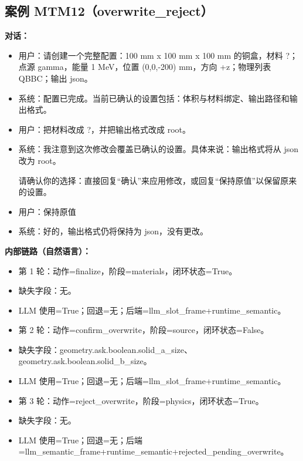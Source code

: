 \documentclass[11pt]{ctexart}
\begin{document}
\subsection{案例 MTM12（overwrite\_reject）}
\textbf{对话：}
\begin{itemize}
\item 用户：请创建一个完整配置：100 mm x 100 mm x 100 mm 的铜盒，材料 ?；点源 gamma，能量 1 MeV，位置 (0,0,-200) mm，方向 +z；物理列表 QBBC；输出 json。
\item 系统：配置已完成。当前已确认的设置包括：体积与材料绑定、输出路径和输出格式。
\item 用户：把材料改成 ?，并把输出格式改成 root。
\item 系统：我注意到这次修改会覆盖已确认的设置。具体来说：输出格式将从 json 改为 root。

请确认你的选择：直接回复“确认”来应用修改，或回复“保持原值”以保留原来的设置。
\item 用户：保持原值
\item 系统：好的，输出格式仍将保持为 json，没有更改。
\end{itemize}
\textbf{内部链路（自然语言）：}
\begin{itemize}
\item 第 1 轮：动作=finalize，阶段=materials，闭环状态=True。
\item 缺失字段：无。
\item LLM 使用=True；回退=无；后端=llm\_slot\_frame+runtime\_semantic。
\item 第 2 轮：动作=confirm\_overwrite，阶段=source，闭环状态=False。
\item 缺失字段：geometry.ask.boolean.solid\_a\_size、geometry.ask.boolean.solid\_b\_size。
\item LLM 使用=True；回退=无；后端=llm\_slot\_frame+runtime\_semantic。
\item 第 3 轮：动作=reject\_overwrite，阶段=physics，闭环状态=True。
\item 缺失字段：无。
\item LLM 使用=True；回退=无；后端=llm\_semantic\_frame+runtime\_semantic+rejected\_pending\_overwrite。
\end{itemize}
\end{document}
